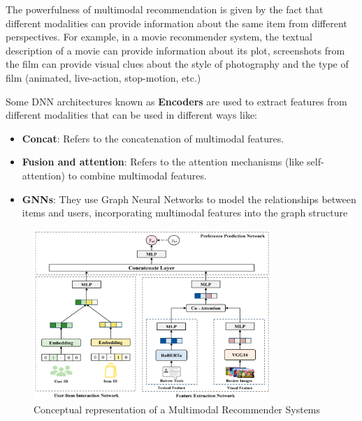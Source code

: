 The powerfulness of multimodal recommendation is given by the fact that different modalities can provide information about the same item from different perspectives. For example, in a movie recommender system, the textual description of a movie can provide information about its plot, screenshots from the film can provide visual clues about the style of photography and the type of film (animated, live-action, stop-motion, etc.)


Some DNN architectures known as \textbf{Encoders} are used to extract features from different modalities that can be used in different ways like:
\begin{itemize}
    \item \textbf{Concat}: Refers to the concatenation of multimodal features. \cite{ConcatFeature}
    \item \textbf{Fusion and attention}: Refers to the attention mechanisms (like self-attention) to combine multimodal features. \cite{Fusion}
    \item \textbf{GNNs}: They use Graph Neural Networks to model the relationships between items and users, incorporating multimodal features into the graph structure
\end{itemize}

\begin{figure}[H]
    \centering
    \includegraphics[height=0.5\textheight ,width=0.8\textwidth]{img/MMRec.png}
    \caption{Conceptual representation of a Multimodal Recommender Systems}
\end{figure}